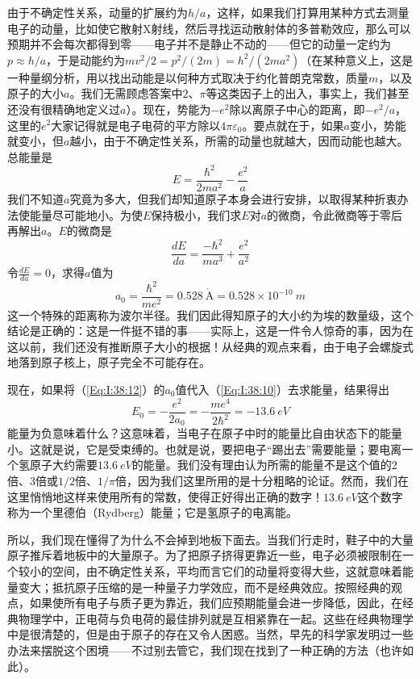 由于不确定性关系，动量的扩展约为$h/a$，这样，如果我们打算用某种方式去测量电子的动量，比如使它散射X射线，然后寻找运动散射体的多普勒效应，那么可以预期并不会每次都得到零——电子并不是静止不动的——但它的动量一定约为$p\approx h/a$，于是动能约为$mv^2/2=p^2/(2m)=h^2/(2ma^2)$（在某种意义上，这是一种量纲分析，用以找出动能是以何种方式取决于约化普朗克常数，质量$m$，以及原子的大小$a$。我们无需顾虑答案中$2$、$\pi$等这类因子上的出入，事实上，我们甚至还没有很精确地定义过$a$）。现在，势能为$-e^2$除以离原子中心的距离，即$-e^2/a$，这里的$e^2$大家记得就是电子电荷的平方除以$4\pi\varepsilon_0$。要点就在于，如果$a$变小，势能就变小，但$a$越小，由于不确定性关系，所需的动量也就越大，因而动能也越大。总能量是
\begin{equation}
    \label{Eq:I:38:10}
    E = \frac{\hbar^2}{2ma^2} - \frac{e^2}{a}
\end{equation}
我们不知道$a$究竟为多大，但我们却知道原子本身会进行安排，以取得某种折衷办法使能量尽可能地小。为使$E$保持极小，我们求$E$对$a$的微商，令此微商等于零后再解出$a$。$E$的微商是
\begin{equation}
    \label{Eq:I:38:11}
    \frac{dE}{da} = \frac{-\hbar^2}{ma^3} + \frac{e^2}{a^2}
\end{equation}
令$\frac{dE}{da} = 0$，求得$a$值为
\begin{equation}
    \label{Eq:I:38:12}
    a_0 = \frac{\hbar^2}{me^2} = 0.528~\mathring{\text{A}} = 0.528 \times 10^{-10}~m
\end{equation}
这一个特殊的距离称为波尔半径。我们因此得知原子的大小约为埃的数量级，这个结论是正确的：这是一件挺不错的事——实际上，这是一件令人惊奇的事，因为在这以前，我们还没有推断原子大小的根据！从经典的观点来看，由于电子会螺旋式地落到原子核上，原子完全不可能存在。

现在，如果将（\ref{Eq:I:38:12}）的$a_0$值代入（\ref{Eq:I:38:10}）去求能量，结果得出
\begin{equation}
    \label{Eq:I:38:13}
    E_0 = -\frac{e^2}{2a_0} = -\frac{me^4}{2\hbar^2} = -13.6~eV
\end{equation}
能量为负意味着什么？这意味着，当电子在原子中时的能量比自由状态下的能量小。这就是说，它是受束缚的。也就是说，要把电子“踢出去”需要能量；要电离一个氢原子大约需要$13.6~eV$的能量。我们没有理由认为所需的能量不是这个值的$2$倍、$3$倍或$1/2$倍、$1/\pi$倍，因为我们这里所用的是十分粗略的论证。然而，我们在这里悄悄地这样来使用所有的常数，使得正好得出正确的数字！$13.6~eV$这个数字称为一个里德伯（Rydberg）能量；它是氢原子的电离能。

所以，我们现在懂得了为什么不会掉到地板下面去。当我们行走时，鞋子中的大量原子推斥着地板中的大量原子。为了把原子挤得更靠近一些，电子必须被限制在一个较小的空间，由不确定性关系，平均而言它们的动量将变得大些，这就意味着能量变大；抵抗原子压缩的是一种量子力学效应，而不是经典效应。按照经典的观点，如果使所有电子与质子更为靠近，我们应预期能量会进一步降低，因此，在经典物理学中，正电荷与负电荷的最佳排列就是互相紧靠在一起。这些在经典物理学中是很清楚的，但是由于原子的存在又令人困惑。当然，早先的科学家发明过一些办法来摆脱这个困境——不过别去管它，我们现在找到了一种正确的方法（也许如此）。

